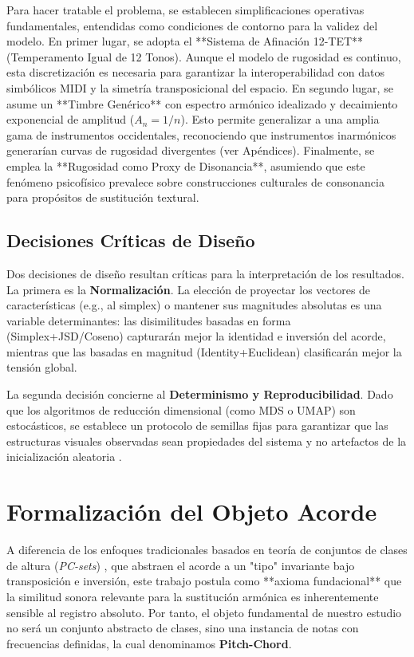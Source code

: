 Para hacer tratable el problema, se establecen simplificaciones operativas fundamentales, entendidas como condiciones de contorno para la validez del modelo. En primer lugar, se adopta el **Sistema de Afinación 12-TET** (Temperamento Igual de 12 Tonos). Aunque el modelo de rugosidad es continuo, esta discretización es necesaria para garantizar la interoperabilidad con datos simbólicos MIDI y la simetría transposicional del espacio. En segundo lugar, se asume un **Timbre Genérico** con espectro armónico idealizado y decaimiento exponencial de amplitud ($A_n = 1/n$). Esto permite generalizar a una amplia gama de instrumentos occidentales, reconociendo que instrumentos inarmónicos generarían curvas de rugosidad divergentes (ver Apéndices). Finalmente, se emplea la **Rugosidad como Proxy de Disonancia**, asumiendo que este fenómeno psicofísico prevalece sobre construcciones culturales de consonancia para propósitos de sustitución textural.

\subsection{Decisiones Críticas de Diseño}
\label{subsec:decisiones_diseno}

Dos decisiones de diseño resultan críticas para la interpretación de los resultados. La primera es la \textbf{Normalización}. La elección de proyectar los vectores de características (e.g., al simplex) o mantener sus magnitudes absolutas es una variable determinantes: las disimilitudes basadas en forma (Simplex+JSD/Coseno) capturarán mejor la identidad e inversión del acorde, mientras que las basadas en magnitud (Identity+Euclidean) clasificarán mejor la tensión global.

La segunda decisión concierne al \textbf{Determinismo y Reproducibilidad}. Dado que los algoritmos de reducción dimensional (como MDS o UMAP) son estocásticos, se establece un protocolo de semillas fijas para garantizar que las estructuras visuales observadas sean propiedades del sistema y no artefactos de la inicialización aleatoria \cite{Wang2021}.

\section{Formalización del Objeto Acorde}
\label{sec:marco_conceptual}

A diferencia de los enfoques tradicionales basados en teoría de conjuntos de clases de altura (\textit{PC-sets}) \cite{AllenForteSTRUCTURE}, que abstraen el acorde a un "tipo" invariante bajo transposición e inversión, este trabajo postula como **axioma fundacional** que la similitud sonora relevante para la sustitución armónica es inherentemente sensible al registro absoluto. Por tanto, el objeto fundamental de nuestro estudio no será un conjunto abstracto de clases, sino una instancia de notas con frecuencias definidas, la cual denominamos \textbf{Pitch-Chord}.

